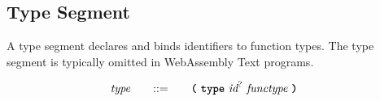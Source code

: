 \subsection{Type Segment}

A type segment declares and binds identifiers to function types. The type segment is typically omitted in WebAssembly Text programs.

\begin{alignat*}{9}
    && \textit{type}    &&\quad ::= &\quad && \textbf{\texttt{(}}\ \textbf{\texttt{type}}\ \textit{id}^?\ \textit{functype}\ \textbf{\texttt{)}}\  \quad && \\[1mm]
\end{alignat*}